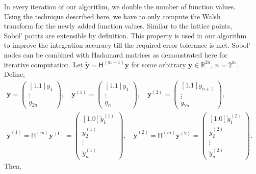 \documentclass{iitthesis}          %
\newcommand{\bm}[1]{\boldsymbol{#1}}
\newcommand{\reals}{\mathbb{R}}
\newcommand{\vy}{\bm{y}}
\newcommand{\mH}{\mathsf{H}}
\newcommand\secref{Section~\ref}
\begin{document}
In every iteration of our algorithm, we double the number of function values. Using the technique described here, we have to only compute the Walsh transform for the newly added function values.
Similar to the lattice points, Sobol' points are extensible by definition. This property is used in our algorithm to improve the integration accuracy till the required error tolerance is met. Sobol' nodes can be combined with Hadamard matrices as demonstrated here for iterative computation. 
Let $\widetilde{\vy} = \mH^{(m+1)} {\vy}$ for some arbitrary $\vy \in \reals^{2n}$, $n = 2^m$. Define, 
\begin{gather*}
\vy = \begin{pmatrix}[1.1] y_1 \\ \vdots \\ y_{2n} \end{pmatrix}, \quad 
\vy^{(1)} = \begin{pmatrix}[1.1] y_1 \\ \vdots \\ y_{n} \end{pmatrix}, \quad 
\vy^{(2)}  = \begin{pmatrix}[1.1] y_{n+1} \\ \vdots \\ y_{2n} \end{pmatrix}, \\ 
\widetilde{\vy}^{(1)} = \mH^{(m)} \vy^{(1)} = 
\begin{pmatrix}[1.0] \widetilde{y}^{(1)}_1 \\ \widetilde{y}^{(1)}_2 \\ \vdots \\ \widetilde{y}^{(1)}_{n} \end{pmatrix}, \quad 
\widetilde{\vy}^{(2)}  =  \mH^{(m)} \vy^{(2)} =
\begin{pmatrix}[1.0] \widetilde{y}^{(2)}_{1} \\  \widetilde{y}^{(2)}_{2} \\ \vdots \\ \widetilde{y}^{(2)}_{n} \end{pmatrix}. 
\end{gather*}
Then,
\end{document}
